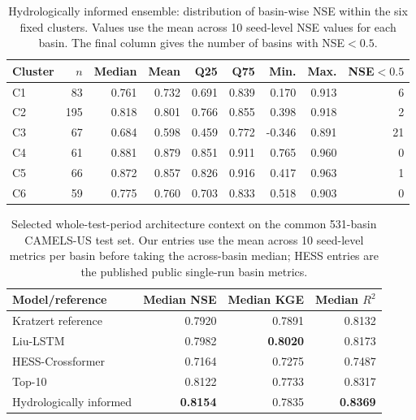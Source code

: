 \begin{table}[htbp]
\centering
\caption{Hydrologically informed ensemble: distribution of basin-wise NSE within the six fixed clusters. Values use the mean across 10 seed-level NSE values for each basin. The final column gives the number of basins with NSE$<0.5$.}
\label{tab:cluster_absolute_nse}
\scriptsize
\renewcommand{\arraystretch}{1.12}
\begin{tabular}{lrrrrrrrr}
\toprule
Cluster & $n$ & Median & Mean & Q25 & Q75 & Min. & Max. & NSE$<0.5$ \\
\midrule
C1 & 83  & 0.761 & 0.732 & 0.691 & 0.839 & 0.170 & 0.913 & 6 \\
C2 & 195 & 0.818 & 0.801 & 0.766 & 0.855 & 0.398 & 0.918 & 2 \\
C3 & 67  & 0.684 & 0.598 & 0.459 & 0.772 & -0.346 & 0.891 & 21 \\
C4 & 61  & 0.881 & 0.879 & 0.851 & 0.911 & 0.765 & 0.960 & 0 \\
C5 & 66  & 0.872 & 0.857 & 0.826 & 0.916 & 0.417 & 0.963 & 1 \\
C6 & 59  & 0.775 & 0.760 & 0.703 & 0.833 & 0.518 & 0.903 & 0 \\
\bottomrule
\end{tabular}
\end{table}

\begin{table}[htbp]
\centering
\caption{Selected whole-test-period architecture context on the common 531-basin CAMELS-US test set. Our entries use the mean across 10 seed-level metrics per basin before taking the across-basin median; HESS entries are the published public single-run basin metrics.}
\label{tab:selected_architecture_context}
\small
\renewcommand{\arraystretch}{1.14}
\begin{tabular}{lrrr}
\toprule
Model/reference & Median NSE & Median KGE & Median $R^2$ \\
\midrule
Kratzert reference & 0.7920 & 0.7891 & 0.8132 \\
Liu-LSTM & 0.7982 & \textbf{0.8020} & 0.8173 \\
HESS-Crossformer & 0.7164 & 0.7275 & 0.7487 \\
Top-10 & 0.8122 & 0.7733 & 0.8317 \\
Hydrologically informed & \textbf{0.8154} & 0.7835 & \textbf{0.8369} \\
\bottomrule
\end{tabular}
\end{table}

